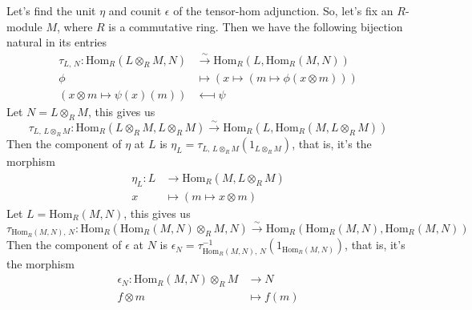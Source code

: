 \begin{example}
Let's find the unit $\eta$ and counit $\epsilon$ of the tensor-hom adjunction. So, let's fix an $R$-module $M$, where $R$ is a commutative ring. Then we have the following bijection natural in its entries
\begin{align*}
\tau_{L,\,N}:\mathrm{Hom}_R(L\otimes_R M,N) &\overset{\sim}{\longrightarrow} \mathrm{Hom}_R(L,\mathrm{Hom}_R(M,N))\\[0.5em]
\phi &\longmapsto (x \mapsto (m \mapsto \phi(x \otimes m)))\\[0.5em]
(x \otimes m \mapsto \psi(x)(m))&\longmapsfrom \psi 
\end{align*}
Let $N = L\otimes_R M$, this gives us
\[\tau_{L,\,L\otimes_R M}:\mathrm{Hom}_R(L\otimes_R M,L\otimes_R M) \overset{\sim}{\longrightarrow} \mathrm{Hom}_R(L,\mathrm{Hom}_R(M,L\otimes_R M))\]
Then the component of $\eta$ at $L$ is $\eta_L = \tau_{L,\,L\otimes_R M}(1_{L\otimes_R M})$, that is, it's the morphism
\begin{align*}
\eta_L:L &\to \mathrm{Hom}_R(M,L\otimes_R M)\\[0.5em]
x &\mapsto (m \mapsto x \otimes m)
\end{align*}
Let $L = \mathrm{Hom}_R(M,N)$, this gives us
\[\tau_{\mathrm{Hom}_R(M,N),\,N}:\mathrm{Hom}_R(\mathrm{Hom}_R(M,N)\otimes_R M,N) \overset{\sim}{\longrightarrow} \mathrm{Hom}_R(\mathrm{Hom}_R(M,N),\mathrm{Hom}_R(M,N))\]
Then the component of $\epsilon$ at $N$ is $\epsilon_N = \tau_{\mathrm{Hom}_R(M,N),\,N}^{-1}(1_{\mathrm{Hom}_R(M,N)})$, that is, it's the morphism
\begin{align*}
\epsilon_N: \mathrm{Hom}_R(M,N)\otimes_R M &\to N\\[0.5em]
f \otimes m&\mapsto f(m)
\end{align*}
\end{example}
%
%
